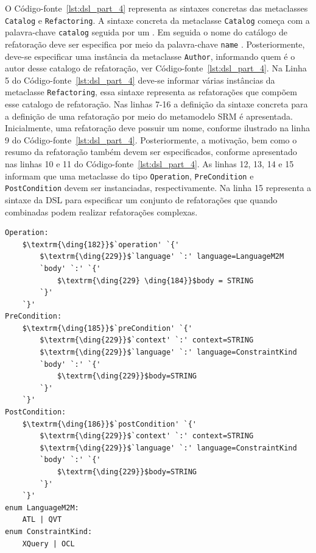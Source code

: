 O Código-fonte~\ref{lst:dsl_part_4} representa as sintaxes concretas das metaclasses \texttt{Catalog} e \texttt{Refactoring}. A sintaxe concreta da metaclasse \texttt{Catalog} começa com a palavra-chave \texttt{catalog} seguida por um \aspas{\{}. Em seguida o nome do catálogo de refatoração deve ser especifica por meio da palavra-chave \texttt{name} . Posteriormente, deve-se especificar uma instância da metaclasse \texttt{Author}, informando quem é o autor desse catalogo de refatoração, ver Código-fonte~\ref{lst:dsl_part_4}. Na Linha 5 do Código-fonte~\ref{lst:dsl_part_4} deve-se informar várias instâncias da metaclasse \texttt{Refactoring}, essa sintaxe representa as refatorações que compõem esse catalogo de refatoração. Nas linhas 7-16 a definição da sintaxe concreta para a definição de uma refatoração por meio do metamodelo SRM é apresentada. Inicialmente, uma refatoração deve possuir um nome, conforme ilustrado na linha 9 do Código-fonte~\ref{lst:dsl_part_4}. Posteriormente, a motivação, bem como o resumo da refatoração também devem ser especificados, conforme apresentado nas linhas 10 e 11 do Código-fonte~\ref{lst:dsl_part_4}. As linhas 12, 13, 14 e 15 informam que uma metaclasse do tipo \texttt{Operation}, \texttt{PreCondition} e \texttt{PostCondition} devem ser instanciadas, respectivamente. Na linha 15 representa a sintaxe da DSL para especificar um conjunto de refatorações que quando combinadas podem realizar refatorações complexas.

\begin{lstlisting}[language=Xtext, frame=single, basicstyle=\scriptsize, mathescape=true, label={lst:dsl_part_5}, caption={Gramática da DSL - parte 5}]
Operation: 
	$\textrm{\ding{182}}$`operation' `{'
		$\textrm{\ding{229}}$`language' `:' language=LanguageM2M
		`body' `:' `{'
			$\textrm{\ding{229} \ding{184}}$body = STRING
		`}'
	`}'
PreCondition: 
	$\textrm{\ding{185}}$`preCondition' `{'
		$\textrm{\ding{229}}$`context' `:' context=STRING
		$\textrm{\ding{229}}$`language' `:' language=ConstraintKind
		`body' `:' `{' 
			$\textrm{\ding{229}}$body=STRING	
		`}'
	`}'
PostCondition: 
	$\textrm{\ding{186}}$`postCondition' `{'
		$\textrm{\ding{229}}$`context' `:' context=STRING
		$\textrm{\ding{229}}$`language' `:' language=ConstraintKind
		`body' `:' `{' 
			$\textrm{\ding{229}}$body=STRING	
		`}'
	`}'
enum LanguageM2M: 
	ATL | QVT
enum ConstraintKind: 
	XQuery | OCL

\end{lstlisting}

